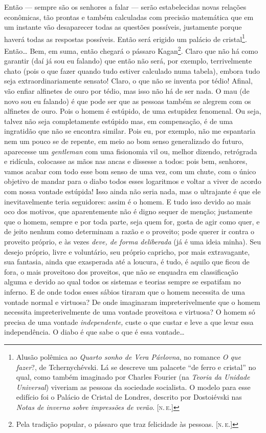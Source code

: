 Então --- sempre são os senhores a falar --- serão estabelecidas novas
relações econômicas, tão prontas e também calculadas com precisão
matemática que em um instante vão desaparecer todas as questões
possíveis, justamente porque haverá todas as respostas possíveis. Então
será erigido um palácio de cristal\footnote{Alusão polêmica ao
  \emph{Quarto sonho de Vera Pávlovna}, no romance \emph{O que fazer}?,
  de Tchernychévski. Lá se descreve um palacete ``de ferro e cristal''
  no qual, como também imaginado por Charles Fourier (na \emph{Teoria da
  Unidade Universal}) viveriam as pessoas da sociedade socialista. O
  modelo para esse edifício foi o Palácio de Cristal de Londres,
  descrito por Dostoiévski nas \emph{Notas de inverno sobre impressões
  de verão}. {[}\textsc{n.\,e.}{]}}. Então\ldots{} Bem, em suma, então chegará o pássaro
Kagan\footnote{Pela tradição popular, o pássaro que traz felicidade às
  pessoas. {[}\textsc{n.\,e.}{]}}. Claro que não há como garantir (daí já sou eu
falando) que então não será, por exemplo, terrivelmente chato (pois o
que fazer quando tudo estiver calculado numa tabela), embora tudo seja
extraordinariamente sensato! Claro, o que não se inventa por tédio!
Afinal, vão enfiar alfinetes de ouro por tédio, mas isso não há de ser
nada. O mau (de novo sou eu falando) é que pode ser que as pessoas
também se alegrem com os alfinetes de ouro. Pois o homem é estúpido, de
uma estupidez fenomenal. Ou seja, talvez não seja completamente estúpido
mas, em compensação, é de uma ingratidão que não se encontra similar.
Pois eu, por exemplo, não me espantaria nem um pouco se de repente, em
meio ao bom senso generalizado do futuro, aparecesse um \emph{gentleman}
com uma fisionomia vil ou, melhor dizendo, retrógrada e ridícula,
colocasse as mãos nas ancas e dissesse a todos: pois bem, senhores,
vamos acabar com todo esse bom senso de uma vez, com um chute, com o
único objetivo de mandar para o diabo todos esses logaritmos e voltar a
viver de acordo com nossa vontade estúpida! Isso ainda não seria nada,
mas o ultrajante é que ele inevitavelmente teria seguidores: assim é o
homem. E tudo isso devido ao mais oco dos motivos, que aparentemente não
é digno sequer de menção; justamente que o homem, sempre e por toda
parte, seja quem for, gosta de agir como quer, e de jeito nenhum como
determinam a razão e o proveito; pode querer ir contra o proveito
próprio, e às vezes \emph{deve, de forma deliberada} (já é uma ideia
minha). Seu desejo próprio, livre e voluntário, seu próprio capricho,
por mais extravagante, sua fantasia, ainda que exasperada até a loucura,
é tudo, é aquilo que ficou de fora, o mais proveitoso dos proveitos, que
não se enquadra em classificação alguma e devido ao qual todos os
sistemas e teorias sempre se espatifam no inferno. E de onde todos esses
sábios tiraram que o homem necessita de uma vontade normal e virtuosa?
De onde imaginaram impreterivelmente que o homem necessita
impreterivelmente de uma vontade proveitosa e virtuosa? O homem só
precisa de uma vontade \emph{independente,} custe o que custar e leve a
que levar essa independência. O diabo é que sabe o que é essa vontade\ldots{}

